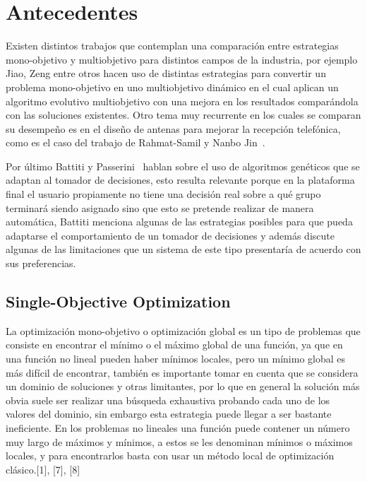 \chapter{Antecedentes}
\label{chapter:chapter02}

Existen distintos trabajos que contemplan una comparación entre estrategias mono-objetivo y multiobjetivo para distintos campos de la industria, por ejemplo Jiao, Zeng\cite{Jiao2017DynamicME} entre otros hacen uso de distintas estrategias para convertir un problema mono-objetivo en uno multiobjetivo dinámico en el cual aplican un algoritmo evolutivo multiobjetivo con una mejora en los resultados comparándola con las soluciones existentes. Otro tema muy recurrente en los cuales se comparan su desempeño es en el diseño de antenas para mejorar la recepción telefónica, como es el caso del trabajo de Rahmat-Samil y Nanbo Jin~\cite{Jin2007-qu}.

Por último Battiti y Passerini~\cite{Battiti2010-xo} hablan sobre el uso de algoritmos genéticos que se adaptan al tomador de decisiones, esto resulta relevante porque en la plataforma final el usuario propiamente no tiene una decisión real sobre a qué grupo terminará siendo asignado sino que esto se pretende realizar de manera automática, Battiti menciona algunas de las estrategias posibles para que pueda adaptarse el comportamiento de un tomador de decisiones y además discute algunas de las limitaciones que un sistema de este tipo presentaría de acuerdo con sus preferencias.\cite{Wang2010-zh} \\

\section{Single-Objective Optimization}
La optimización mono-objetivo o optimización global es un tipo de problemas que consiste en encontrar el mínimo o el máximo global de una función, ya que en una función no lineal pueden haber mínimos locales, pero un mínimo global es más difícil de encontrar, también es importante tomar en cuenta que se considera un dominio de soluciones y otras limitantes, por lo que en general la solución más obvia suele ser realizar una búsqueda exhaustiva probando cada uno de los valores del dominio, sin embargo esta estrategia puede llegar a ser bastante ineficiente. En los problemas no lineales una función puede contener un número muy largo de máximos y mínimos, a estos se les denominan mínimos o máximos locales, y para encontrarlos basta con usar un método local de optimización clásico.[1], [7], [8] \\

